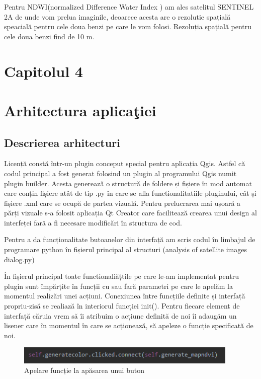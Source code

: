 \documentclass[12pt,a4paper]{article}
\theoremstyle{definition}
\theoremstyle{remark}
\begin{document}
Pentru NDWI(normalized Difference Water Index ) am ales satelitul SENTINEL 2A de unde vom prelua imaginile, deoarece acesta are o rezolutie spațială speacială pentru cele doua benzi pe care le vom folosi. Rezoluția spațială pentru cele doua benzi find de 10 m.

\newpage
\section*{\bf Capitolul 4}
\markright{}
\section*{{\bf Arhitectura aplica\c tiei}}
\markright{}
\setcounter{section}{1}
\subsection{Descrierea arhitecturi}

   Licență constă într-un plugin conceput special pentru aplicația Qgis. Astfel că codul principal a fost generat folosind un plugin al programului Qgis numit plugin builder. Acesta generează o structură de foldere și fișiere în mod automat care conțin fișiere atât de tip .py în care se afla functionalitatiile pluginului, cât și fișiere .xml care se ocupă de partea vizuală. Pentru  prelucrarea mai ușoară a părți vizuale s-a folosit aplicația Qt Creator care facilitează crearea unui design al interfeței fară a fi necesare modificări în structura de cod. 
    
    Pentru a da funcționalitate butoanelor din interfață am scris codul în limbajul de programare python în fișierul principal al structuri (analysis of satellite images dialog.py)
    
    În fișierul principal toate functionaliățtile pe care le-am implementat pentru plugin sunt împărțite în funcții cu sau fară parametri pe care le apelăm la momentul realizări unei acțiuni. Conexiunea între funcțiile definite și interfață propriu-zisă se realiază în interiorul funcției init(). Pentru fiecare element de interfață căruia vrem să îi atribuim o acțiune definită de noi îi adaugăm un lisener care în momentul în care se acționează, să apeleze o funcție specificată de noi.
    

\begin{figure}[H]
  \centering
  \includegraphics[width=300pt]{click.PNG}
  \caption{Apelare funcție la apăsarea unui buton}   
\end{figure}
  
\end{document}
